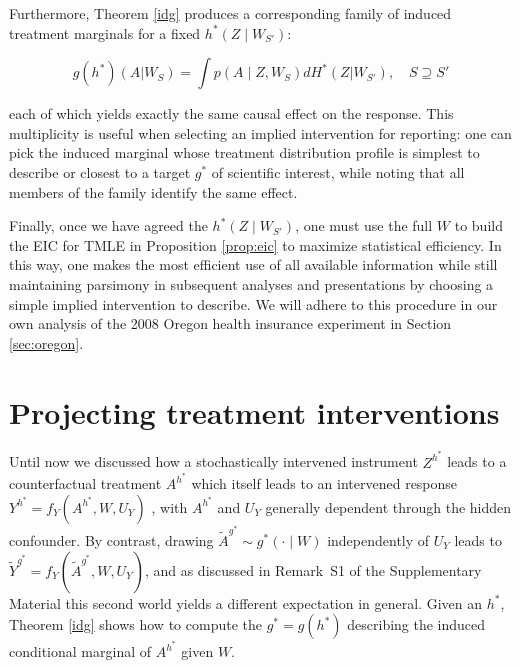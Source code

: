 \documentclass[12pt]{article}
\theoremstyle{thmstyleone}%
\theoremstyle{thmstyletwo}%
\theoremstyle{thmstylethree}%
\begin{document}
Furthermore, Theorem \ref{idg} produces  {a corresponding family of induced treatment marginals} for a fixed $h^*(Z \mid W_{S'})$:

\begin{equation}\label{eq:implied_interventions}
	g(h^*)(A|W_S)  = \int   p(A \mid Z, W_S) dH^*(Z|W_{S'}), \quad S \supseteq S'
\end{equation}

each of which yields exactly the same causal effect on the response.  {This multiplicity is useful when selecting an implied intervention for reporting: one can pick the induced marginal whose treatment distribution profile is simplest to describe or closest to a target $g^*$ of scientific interest, while noting that all members of the family identify the same effect.}

Finally, once we have agreed the $h^*(Z \mid W_{S'})$, one must use the full $W$ to build the EIC for TMLE in Proposition \ref{prop:eic} to maximize statistical efficiency. In this way, one makes the most efficient use of all available information while still maintaining parsimony in subsequent analyses and presentations by choosing a simple implied intervention to describe. We will adhere to this procedure in our own analysis of the 2008 Oregon health insurance experiment in Section \ref{sec:oregon}. 


\section{Projecting treatment interventions}
Until now we discussed how a stochastically intervened instrument $Z^{h^*}$ leads to a counterfactual treatment $A^{h^*}$ which itself leads to an intervened response $Y^{h^*}=f_Y( A^{h^*},W, {U_Y})$ {, with $A^{h^*}$ and $U_Y$ generally dependent through the hidden confounder}.  {By contrast, drawing $\widetilde A^{g^*}\sim g^*(\cdot\mid W)$ independently of $U_Y$ leads to $\widetilde Y^{g^*}=f_Y(\widetilde A^{g^*},W,U_Y)$, and as discussed in Remark~S1 of the Supplementary Material this second world yields a different expectation in general.} Given an $h^*$, Theorem \ref{idg} shows how  {to} compute the $g^*=g(h^*)$  {describing the induced conditional marginal of $A^{h^*}$ given $W$}. 
\end{document}
